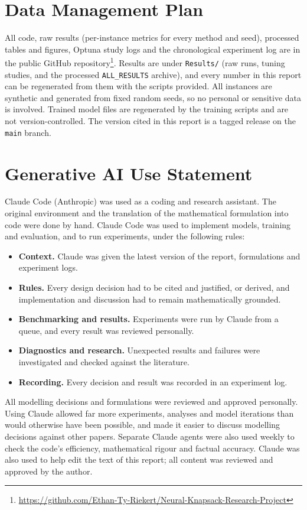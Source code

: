 \documentclass[12pt]{article}
\begin{document}
\section*{Data Management Plan}
All code, raw results (per-instance metrics for every method and seed), processed tables and figures, Optuna study logs and the chronological experiment log are in the public GitHub repository\footnote{\url{https://github.com/Ethan-Ty-Riekert/Neural-Knapsack-Research-Project}}. Results are under \texttt{Results/} (raw runs, tuning studies, and the processed \texttt{ALL\_RESULTS} archive), and every number in this report can be regenerated from them with the scripts provided. All instances are synthetic and generated from fixed random seeds, so no personal or sensitive data is involved. Trained model files are regenerated by the training scripts and are not version-controlled. The version cited in this report is a tagged release on the \texttt{main} branch.

\section*{Generative AI Use Statement}
Claude Code (Anthropic) was used as a coding and research assistant. The original environment and the translation of the mathematical formulation into code were done by hand. Claude Code was used to implement models, training and evaluation, and to run experiments, under the following rules:
\begin{itemize}
    \item \textbf{Context.} Claude was given the latest version of the report, formulations and experiment logs.
    \item \textbf{Rules.} Every design decision had to be cited and justified, or derived, and implementation and discussion had to remain mathematically grounded.
    \item \textbf{Benchmarking and results.} Experiments were run by Claude from a queue, and every result was reviewed personally.
    \item \textbf{Diagnostics and research.} Unexpected results and failures were investigated and checked against the literature.
    \item \textbf{Recording.} Every decision and result was recorded in an experiment log.
\end{itemize}
All modelling decisions and formulations were reviewed and approved personally. Using Claude allowed far more experiments, analyses and model iterations than would otherwise have been possible, and made it easier to discuss modelling decisions against other papers. Separate Claude agents were also used weekly to check the code's efficiency, mathematical rigour and factual accuracy. Claude was also used to help edit the text of this report; all content was reviewed and approved by the author.
\end{document}
